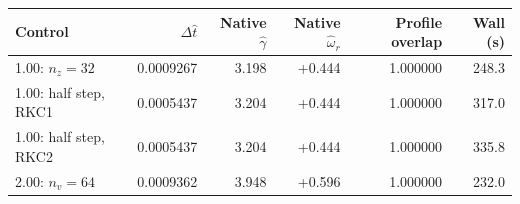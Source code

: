 \begin{tabular}{@{}lrrrrr@{}}
\toprule
Control & $\Delta\widehat t$ & Native $\widehat\gamma$ & Native $\widehat\omega_r$ & Profile overlap & Wall (s)\\
\midrule
1.00: $n_z=32$ & 0.0009267 & 3.198 & +0.444 & 1.000000 & 248.3\\
1.00: half step, RKC1 & 0.0005437 & 3.204 & +0.444 & 1.000000 & 317.0\\
1.00: half step, RKC2 & 0.0005437 & 3.204 & +0.444 & 1.000000 & 335.8\\
2.00: $n_v=64$ & 0.0009362 & 3.948 & +0.596 & 1.000000 & 232.0\\
\bottomrule
\end{tabular}
